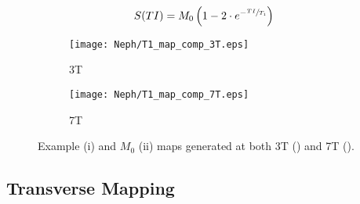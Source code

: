 \begin{equation}
	S(TI) = M_0\left(1-2 \cdot e^{-\sfrac{TI}{T_1}}\right)
	\label{eq:ex_t1}
\end{equation}
 

\begin{figure}[H]
	\centering
	\begin{subfigure}[c]{0.47\textwidth}
		\centering
		\texttt{[image: Neph/T1\_map\_comp\_3T.eps]}
		\caption{3T}
		\label{fig:ex_t1_map_3t}
	\end{subfigure}
	\hfill
	\begin{subfigure}[c]{0.47\textwidth}
		\centering
		\texttt{[image: Neph/T1\_map\_comp\_7T.eps]}
		\caption{7T}
		\label{fig:ex_t1_map_7t}
	\end{subfigure}
	\caption{Example \tone (i) and $M_0$ (ii) maps generated at both 3T () and 7T ().}
	\label{fig:ex_t1_maps}
\end{figure}

\subsection{Transverse \ttwo Mapping}

